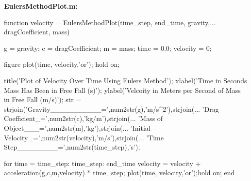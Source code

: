 \documentclass[12pt]{article}
\begin{document}
\textbf{EulersMethodPlot.m:}
\begin{verbatimtab}
function velocity = EulersMethodPlot(time_step, end_time, gravity,... 
                                 dragCoefficient, mass)
                             

    g = gravity;            %
    c = dragCoefficient;    %
    m = mass;               %
    time = 0.0;             %
    velocity = 0;           %

    figure
    plot(time, velocity,'or'); hold on;
    
    title('Plot of Velocity Over Time Using Eulers Method'); %
    xlabel('Time in Seconds Mass Has Been in Free Fall (s)');%
    ylabel('Velcoity in Meters per Second of Mass in Free Fall (m/s)');
    str = {strjoin({'Gravity__________=',num2str(g),'m/s^2'}),strjoin(...      %
                   {'Drag Coefficient_=',num2str(c),'kg/m'}),strjoin(...       %
                   {'Mass of Object___=',num2str(m),'kg'}),strjoin(...         %
                   {'Initial Velocity_=',num2str(velocity),'m/s'}),strjoin(... %
                   {'Time Step________=',num2str(time_step),'s'})};            %
    
    for time = time_step: time_step: end_time
        velocity = velocity + acceleration(g,c,m,velocity) * time_step;
        plot(time, velocity,'or');hold on;
    end
    

\end{verbatimtab}
\end{document}
